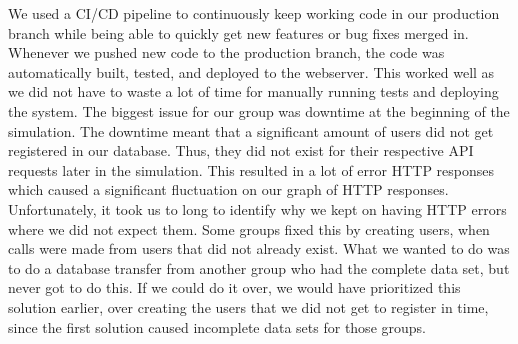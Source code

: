 \vspace{0.5em} \newline
We used a CI/CD pipeline to continuously keep working code in our production branch while being able to quickly get new features or bug fixes merged in. Whenever we pushed new code to the production branch, the code was automatically built, tested, and deployed to the webserver. This worked well as we did not have to waste a lot of time for manually running tests and deploying the system.
\vspace{0.5em} \newline
The biggest issue for our group was downtime at the beginning of the simulation. The downtime meant that a significant amount of users did not get registered in our database. Thus, they did not exist for their respective API requests later in the simulation. This resulted in a lot of error HTTP responses which caused a significant fluctuation on our graph of HTTP responses. Unfortunately, it took us to long to identify why we kept on having HTTP errors where we did not expect them.
\vspace{0.5em} \newline
Some groups fixed this by creating users, when calls were made from users that did not already exist. 
What we wanted to do was to do a database transfer from another group who had the complete data set, but never got to do this. If we could do it over, we would have prioritized this solution earlier, over creating the users that we did not get to register in time, since the first solution caused incomplete data sets for those groups. 
